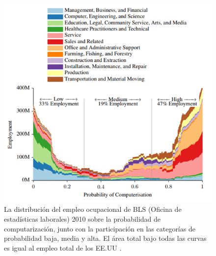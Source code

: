     \begin{figure}[htb]
        \centering
        \includegraphics[width=1\linewidth]{Main/Chapter2/Images2/distribucion-del-empleo.png}
        \caption{La distribución del empleo ocupacional de BLS (Oficina de estadísticas laborales) 2010 sobre la probabilidad de computarización, junto con la participación en las categorías de probabilidad baja, media y alta. El área total bajo todas las curvas es igual al empleo total de los EE.UU \cite{FREY2017254}.}
        \label{f:Cap2_general_distribucion_empleo}
    \end{figure}
    
        \newpage


